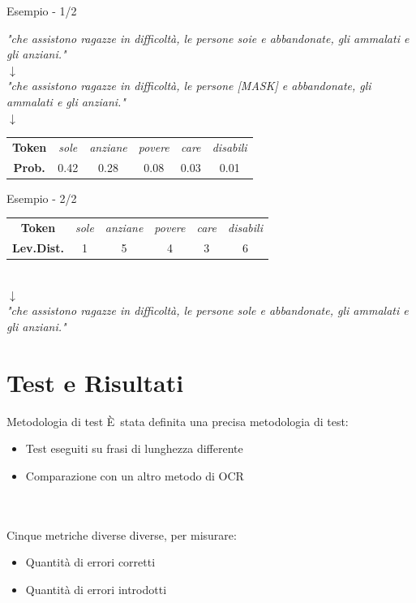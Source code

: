 \documentclass{beamer}
\newcommand{\E}{È}
\begin{document}
\begin{frame}{Esempio - 1/2}

\begin{center}
\textit{"che assistono ragazze in difficoltà, le persone {\color{rossoPantano} soie} e abbandonate, gli ammalati e gli anziani."}\\
$\downarrow$\\
\textit{"che assistono ragazze in difficoltà, le persone {\color{rossoPantano}[MASK]}  e abbandonate, gli ammalati e gli anziani."}\\
$\downarrow$\\
\begin{tabular}{c|ccccc}
\textbf{Token} & \textit{sole} & \textit{anziane} & \textit{povere} & \textit{care} & \textit{disabili}\\
\textbf{Prob.} & 0.42 & 0.28 & 0.08 & 0.03 & 0.01 \\
\end{tabular}
\end{center}
\end{frame}

\begin{frame}{Esempio - 2/2}
\begin{center}

\begin{tabular}{c|ccccc}
\textbf{Token} & \color{rossoPantano} \textit{sole} & \textit{anziane} & \textit{povere} & \textit{care} & \textit{disabili}\\
\textbf{Lev.Dist.} & \color{rossoPantano} 1 & 5 & 4 & 3 & 6 \\
\end{tabular}\ \\
$\downarrow$\\
\textit{"che assistono ragazze in difficoltà, le persone {\color{rossoPantano}sole}  e abbandonate, gli ammalati e gli anziani."}\\

\end{center}
\end{frame}



\section{Test e Risultati}
\begin{frame}{Metodologia di test}
\E\ stata definita una precisa metodologia di test:
\begin{itemize}
\item Test eseguiti su frasi di lunghezza differente
\item Comparazione con un altro metodo di OCR
\end{itemize}\ \\ \
\\
Cinque metriche diverse diverse, per misurare:
\begin{itemize}
\item Quantità di errori corretti
\item Quantità di errori introdotti
\end{itemize}

\end{frame}
\end{document}
